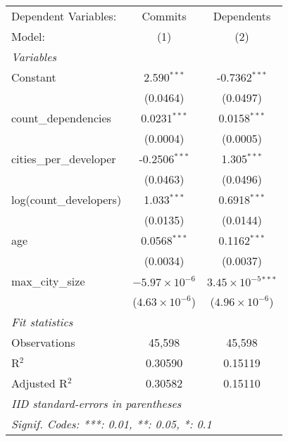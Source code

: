 
\begingroup
\centering
\begin{tabular}{lcc}
   \tabularnewline \midrule \midrule
   Dependent Variables:     & Commits       & Dependents\\   
   Model:                   & (1)                     & (2)\\  
   \midrule
   \emph{Variables}\\
   Constant                 & 2.590$^{***}$           & -0.7362$^{***}$\\   
                            & (0.0464)                & (0.0497)\\   
   count\_dependencies      & 0.0231$^{***}$          & 0.0158$^{***}$\\   
                            & (0.0004)                & (0.0005)\\   
   cities\_per\_developer   & -0.2506$^{***}$         & 1.305$^{***}$\\   
                            & (0.0463)                & (0.0496)\\   
   log(count\_developers)   & 1.033$^{***}$           & 0.6918$^{***}$\\   
                            & (0.0135)                & (0.0144)\\   
   age                      & 0.0568$^{***}$          & 0.1162$^{***}$\\   
                            & (0.0034)                & (0.0037)\\   
   max\_city\_size          & $-5.97\times 10^{-6}$   & $3.45\times 10^{-5}$$^{***}$\\    
                            & ($4.63\times 10^{-6}$)  & ($4.96\times 10^{-6}$)\\    
   \midrule
   \emph{Fit statistics}\\
   Observations             & 45,598                  & 45,598\\  
   R$^2$                    & 0.30590                 & 0.15119\\  
   Adjusted R$^2$           & 0.30582                 & 0.15110\\  
   \midrule \midrule
   \multicolumn{3}{l}{\emph{IID standard-errors in parentheses}}\\
   \multicolumn{3}{l}{\emph{Signif. Codes: ***: 0.01, **: 0.05, *: 0.1}}\\
\end{tabular}
\par\endgroup


